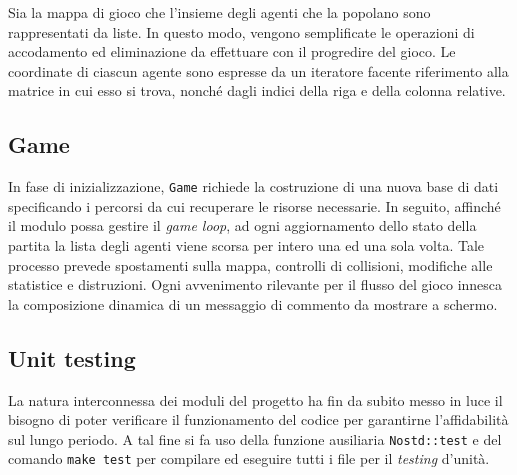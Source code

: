 \documentclass[a4paper]{article}
\begin{document}
Sia la mappa di gioco che l'insieme degli agenti che la popolano sono
rappresentati da liste. In questo modo, vengono semplificate le operazioni di
accodamento ed eliminazione da effettuare con il progredire del gioco. Le
coordinate di ciascun agente sono espresse da un iteratore facente riferimento
alla matrice in cui esso si trova, nonch\'e dagli indici della riga e della
colonna relative.

\subsection{Game}

In fase di inizializzazione, \verb!Game! richiede la costruzione di una nuova
base di dati specificando i percorsi da cui recuperare le risorse necessarie.
In seguito, affinch\'e il modulo possa gestire il \emph{game loop}, ad ogni
aggiornamento dello stato della partita la lista degli agenti viene scorsa per
intero una ed una sola volta. Tale processo prevede spostamenti sulla mappa,
controlli di collisioni, modifiche alle statistice e distruzioni. Ogni
avvenimento rilevante per il flusso del gioco innesca la composizione dinamica
di un messaggio di commento da mostrare a schermo.

\subsection{Unit testing}

La natura interconnessa dei moduli del progetto ha fin da subito messo in luce
il bisogno di poter verificare il funzionamento del codice per garantirne
l'affidabilit\`a sul lungo periodo. A tal fine si fa uso della funzione
ausiliaria \verb!Nostd::test! e del comando \verb!make test! per compilare ed
eseguire tutti i file per il \emph{testing} d'unit\`a.
\end{document}
